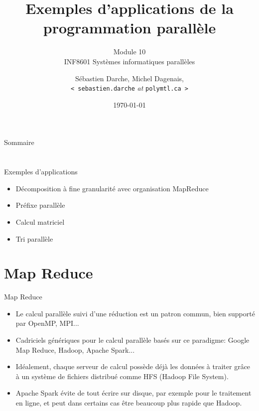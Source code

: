\documentclass[10pt]{beamer}
\begin{document}

\title[]{Exemples d'applications de la programmation parallèle} 
\subtitle{Module 10 \\
INF8601 Systèmes informatiques parallèles}
\author{Sébastien Darche, Michel Dagenais, \\\texttt{< sebastien.darche} \textit{at} \texttt{polymtl.ca >}} 
\date{\today} 

\begin{frame}[plain]
  \titlepage
\end{frame}

\begin{frame}{Sommaire}
  \tableofcontents
\end{frame}

\section{}

\begin{frame}{Exemples d'applications}

  \begin{itemize}
    \item Décomposition à fine granularité avec organisation MapReduce

    \item Préfixe parallèle

    \item Calcul matriciel

    \item Tri parallèle
  \end{itemize}
\end{frame}

\section{Map Reduce}

\begin{frame}{Map Reduce}

  \begin{itemize}
    \item Le calcul parallèle suivi d'une réduction est un patron commun, bien supporté par OpenMP, MPI...

    \item Cadriciels génériques pour le calcul parallèle basés sur ce paradigme: Google Map Reduce, Hadoop, Apache Spark...

    \item Idéalement, chaque serveur de calcul possède déjà les données à traiter grâce à un système de fichiers distribué comme HFS (Hadoop File System). 

    \item Apache Spark évite de tout écrire sur disque, par exemple pour le traitement en ligne, et peut dans certains cas être beaucoup plus rapide que Hadoop.
  \end{itemize}
\end{frame}
\end{document}

